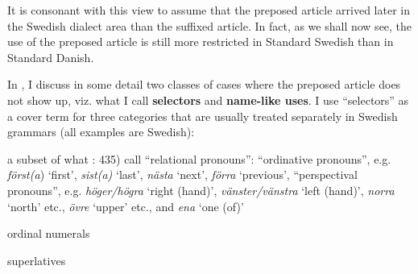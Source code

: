 
It is consonant with this view to assume that the preposed article arrived later in the Swedish dialect area than the suffixed article. In fact, as we shall now see, the use of the preposed article is still more restricted in Standard Swedish than in Standard Danish. 


In \citet{Dahl2003}, I discuss in some detail two classes of cases where the preposed article does not show up, viz. what I call \textbf{selectors} and \textbf{name-like uses}. I use “selectors” as a cover term for three categories that are usually treated separately in Swedish grammars (all examples are Swedish):


\item 

a subset of what \citet{TelemanEtAl1999}: 435) call “relational pronouns”: “ordinative pronouns”, e.g. \textit{först(a}) ‘first’, \textit{sist(a)} ‘last’, \textit{nästa} ‘next’, \textit{förra }‘previous’, “perspectival pronouns”, e.g. \textit{höger/högra }‘right (hand)’, \textit{vänster/vänstra} ‘left (hand)’, \textit{norra} ‘north’ etc., \textit{övre} ‘upper’ etc., and \textit{ena} ‘one (of)’ 


\item 

ordinal numerals


\item 

superlatives



